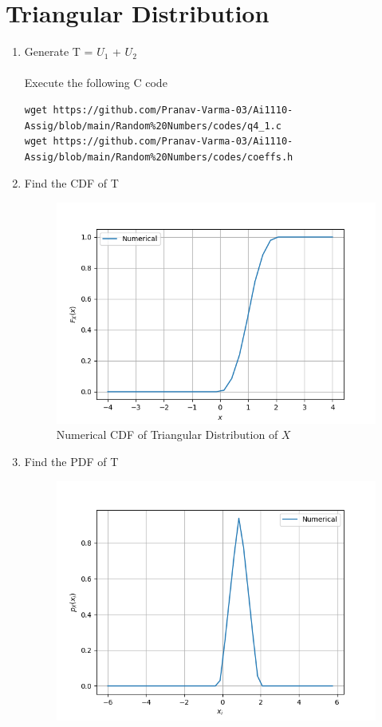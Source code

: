 \documentclass[journal,12pt,twocolumn]{IEEEtran}
\renewcommand\thesection{\arabic{section}}
\begin{document}
\section{Triangular Distribution}
\begin{enumerate}[label=\textbf{\thesection.\arabic*},ref=\thesection.\theenumi]
%
\item
%
Generate T = $U_1$ + $U_2$ \\
\solution \\
Execute the following C code
\begin{lstlisting}
wget https://github.com/Pranav-Varma-03/Ai1110-Assig/blob/main/Random%20Numbers/codes/q4_1.c
wget https://github.com/Pranav-Varma-03/Ai1110-Assig/blob/main/Random%20Numbers/codes/coeffs.h
\end{lstlisting}
%
\item
%
Find the CDF of T \\
%
\begin{figure}[!ht]
\centering
\includegraphics[width=\columnwidth]{figs/cdf_plot_tri.png}
\caption{Numerical CDF of Triangular Distribution of $X$}
\label{fig:CDF_Numerical}
\end{figure}
%
\item
%
Find the PDF of T \\
%
\begin{figure}[!ht]
\centering
\includegraphics[width=\columnwidth]{figs/pdf_plot_tri.png}

\end{figure}
\end{enumerate}
\end{document}

